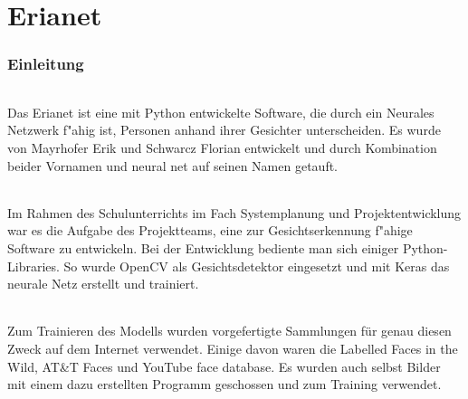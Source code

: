 \documentclass[12pt]{article}
\begin{document}
\tableofcontents
\newpage

\part{Erianet}
\section{Einleitung}
\paragraph{}
Das Erianet ist eine mit Python entwickelte Software, die
durch ein Neurales Netzwerk f"ahig ist,
Personen anhand ihrer Gesichter unterscheiden.
Es wurde von Mayrhofer Erik und Schwarcz Florian
entwickelt und durch Kombination beider Vornamen und \glqq neural net\grqq{}
auf seinen Namen getauft.
\paragraph{}
Im Rahmen des Schulunterrichts im Fach \glqq Systemplanung und Projektentwicklung\grqq{}
war es die Aufgabe des Projektteams, eine zur Gesichtserkennung
f"ahige Software zu entwickeln.
Bei der Entwicklung bediente man sich einiger Python-Libraries.
So wurde OpenCV als Gesichtsdetektor eingesetzt und mit Keras das neurale
Netz erstellt und trainiert.
\paragraph{}
Zum Trainieren des Modells wurden vorgefertigte Sammlungen für genau diesen
Zweck auf dem Internet verwendet. Einige davon waren die \glqq Labelled Faces in the Wild\grqq{},
\glqq AT\&T Faces\grqq{} und \glqq YouTube face database\grqq{}. Es wurden
auch selbst Bilder mit einem dazu erstellten Programm geschossen und zum Training verwendet.
\end{document}
